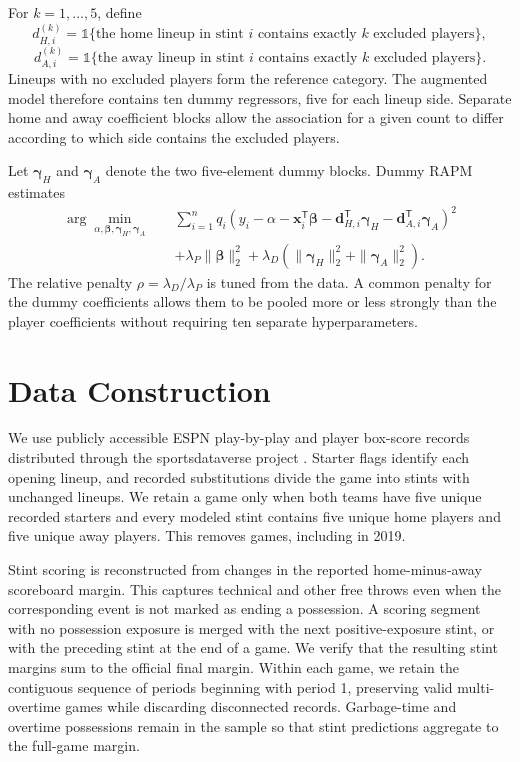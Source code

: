 \documentclass[12pt]{article}
\begin{document}
For $k=1,\ldots,5$, define
\[
d_{H,i}^{(k)}
=
\mathds{1}\{\text{the home lineup in stint }i
\text{ contains exactly }k\text{ excluded players}\},
\]
\[
d_{A,i}^{(k)}
=
\mathds{1}\{\text{the away lineup in stint }i
\text{ contains exactly }k\text{ excluded players}\}.
\]
Lineups with no excluded players form the reference category. The augmented
model therefore contains ten dummy regressors, five for each lineup side.
Separate home and away coefficient blocks allow the association for a given
count to differ according to which side contains the excluded players.

Let $\boldsymbol{\gamma}_H$ and $\boldsymbol{\gamma}_A$ denote the two
five-element dummy blocks. Dummy RAPM estimates
\[
\begin{split}
\arg\min_{\alpha,\boldsymbol{\beta},
\boldsymbol{\gamma}_H,\boldsymbol{\gamma}_A}
\quad&
\sum_{i=1}^{n}q_i
\left(
y_i-\alpha-\mathbf{x}_i^\mathsf{T}\boldsymbol{\beta}
-\mathbf{d}_{H,i}^\mathsf{T}\boldsymbol{\gamma}_H
-\mathbf{d}_{A,i}^\mathsf{T}\boldsymbol{\gamma}_A
\right)^2\\
&+\lambda_P\|\boldsymbol{\beta}\|_2^2
+\lambda_D\left(
\|\boldsymbol{\gamma}_H\|_2^2+
\|\boldsymbol{\gamma}_A\|_2^2
\right).
\end{split}
\]
The relative penalty $\rho=\lambda_D/\lambda_P$ is tuned from the data. A
common penalty for the dummy coefficients allows them to be pooled more or
less strongly than the player coefficients without requiring ten separate
hyperparameters.

\section{Data Construction}

We use publicly accessible ESPN play-by-play and player box-score records
distributed through the sportsdataverse project \citep{Gilani2026}. Starter
flags identify each opening lineup, and recorded substitutions divide the game
into stints with unchanged lineups. We retain a game only when both teams have
five unique recorded starters and every modeled stint contains five unique
home players and five unique away players. This removes
\StarterExcludedGames{} games, including
\StarterExcludedTwentyNineteenGames{} in 2019.

Stint scoring is reconstructed from changes in the reported home-minus-away
scoreboard margin. This captures technical and other free throws even when the
corresponding event is not marked as ending a possession. A scoring segment
with no possession exposure is merged with the next positive-exposure stint,
or with the preceding stint at the end of a game. We verify that the resulting
stint margins sum to the official final margin. Within each game, we retain the
contiguous sequence of periods beginning with period 1, preserving valid
multi-overtime games while discarding disconnected records. Garbage-time and
overtime possessions remain in the sample so that stint predictions aggregate
to the full-game margin.
\end{document}
